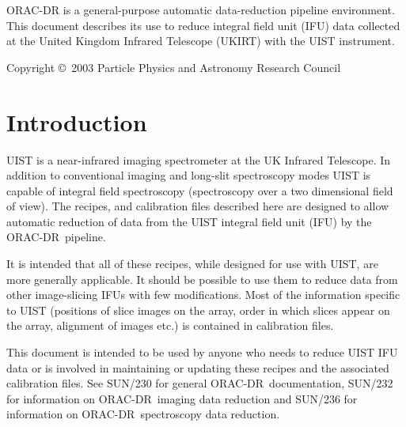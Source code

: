 \documentclass[twoside,11pt]{article}
\newcommand{\stardocinitials}  {SUN}
\newcommand{\stardoccopyright} {Copyright \copyright\ 2003 Particle Physics and Astronomy Research Council}
\newcommand{\stardocnumber}    {246.1}
\newcommand{\stardocabstract}  {ORAC-DR is a
general-purpose automatic data-reduction pipeline environment.  This
document describes its use to reduce integral field unit (IFU) data
collected at the United Kingdom Infrared Telescope (UKIRT) with the
UIST instrument. }
\newcommand{\stardocname}{\stardocinitials /\stardocnumber}
\newenvironment{latexonly}{}{}
\newcommand{\xref}[3]{#1}
\renewcommand{\_}{\texttt{\symbol{95}}}
\newcommand{\ORACDR}{{\footnotesize ORAC-DR}}
\renewcommand{\thepage}{\roman{page}}
\begin{document}
\stardocabstract

\begin{latexonly}
\newpage
\vspace*{\fill}
\stardoccopyright
\end{latexonly}

  \newpage
  \begin{latexonly}
    \setlength{\parskip}{0mm}
    \tableofcontents
    \setlength{\parskip}{\medskipamount}
    \markboth{\stardocname}{\stardocname}
  \end{latexonly}

\cleardoublepage
\renewcommand{\thepage}{\arabic{page}}
\setcounter{page}{1}



\section{Introduction}

UIST is a near-infrared imaging spectrometer at the UK Infrared
Telescope. In addition to conventional imaging and long-slit
spectroscopy modes UIST is capable of integral field spectroscopy
(spectroscopy over a two dimensional field of view). The recipes,
and calibration files described here are designed to allow
automatic reduction of data from the UIST integral field unit (IFU) by
the \ORACDR\ pipeline.

It is intended that all of these recipes, while designed for use with
UIST, are more generally applicable. It should be possible to use them
to reduce data from other image-slicing IFUs with few
modifications. Most of the information specific to UIST (positions of
slice images on the array, order in which slices appear on the array,
alignment of images etc.) is contained in calibration files. 

This document is intended to be used by anyone who needs to reduce
UIST IFU data or is involved in maintaining or updating these recipes
and the associated calibration files. See \xref{SUN/230}{sun230}{} for
general \ORACDR\ documentation, \xref{SUN/232}{sun232}{} for
information on \ORACDR\ imaging data reduction and
\xref{SUN/236}{sun236}{} for information on \ORACDR\ spectroscopy data
reduction.
\end{document}
